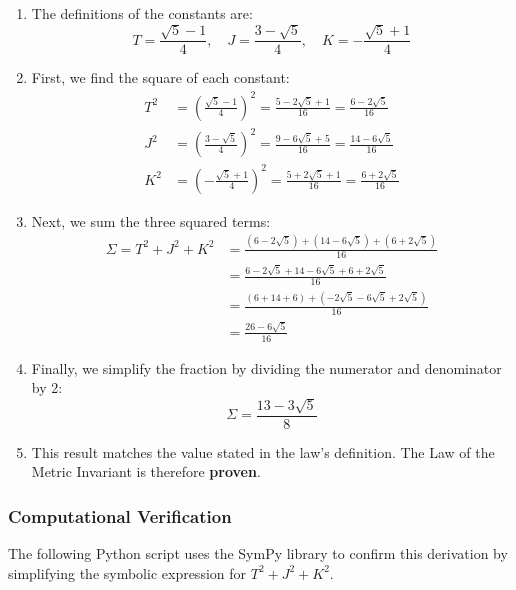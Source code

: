 \begin{enumerate}
    \item The definitions of the constants are:
    $$ T = \frac{\sqrt{5}-1}{4}, \quad J = \frac{3-\sqrt{5}}{4}, \quad K = -\frac{\sqrt{5}+1}{4} $$
    
    \item First, we find the square of each constant:
    \begin{align*}
        T^2 &= \left(\frac{\sqrt{5}-1}{4}\right)^2 = \frac{5 - 2\sqrt{5} + 1}{16} = \frac{6 - 2\sqrt{5}}{16} \\
        J^2 &= \left(\frac{3-\sqrt{5}}{4}\right)^2 = \frac{9 - 6\sqrt{5} + 5}{16} = \frac{14 - 6\sqrt{5}}{16} \\
        K^2 &= \left(-\frac{\sqrt{5}+1}{4}\right)^2 = \frac{5 + 2\sqrt{5} + 1}{16} = \frac{6 + 2\sqrt{5}}{16}
    \end{align*}
    
    \item Next, we sum the three squared terms:
    \begin{align*}
        \Sigma = T^2 + J^2 + K^2 &= \frac{(6 - 2\sqrt{5}) + (14 - 6\sqrt{5}) + (6 + 2\sqrt{5})}{16} \\
        &= \frac{6 - 2\sqrt{5} + 14 - 6\sqrt{5} + 6 + 2\sqrt{5}}{16} \\
        &= \frac{(6+14+6) + (-2\sqrt{5}-6\sqrt{5}+2\sqrt{5})}{16} \\
        &= \frac{26 - 6\sqrt{5}}{16}
    \end{align*}
    
    \item Finally, we simplify the fraction by dividing the numerator and denominator by 2:
    $$ \Sigma = \frac{13 - 3\sqrt{5}}{8} $$
    
    \item This result matches the value stated in the law's definition. The Law of the Metric Invariant is therefore \textbf{proven}.
\end{enumerate}

\subsubsection*{Computational Verification}
The following Python script uses the SymPy library to confirm this derivation by simplifying the symbolic expression for $T^2 + J^2 + K^2$.

